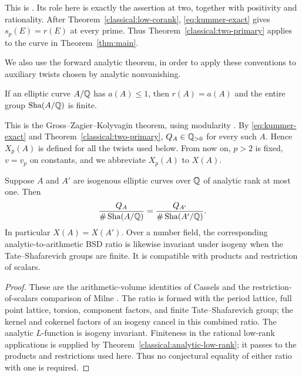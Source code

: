 This is \cite[Theorem~1.1]{B}. Its role here is exactly
the assertion at two, together with positivity and rationality.
After Theorem~\ref{classical:low-corank},
\eqref{eq:kummer-exact} gives $s_p(E)=r(E)$ at every prime. Thus
Theorem~\ref{classical:two-primary} applies to the curve in
Theorem~\ref{thm:main}.

We also use the forward analytic theorem, in order to apply these
conventions to auxiliary twists chosen by analytic nonvanishing.

\begin{theorem}\label{classical:analytic-low-rank}
If an elliptic curve $A/\mathbb Q$ has $a(A)\leq1$, then
$r(A)=a(A)$ and the entire group $\operatorname{Sha}(A/\mathbb Q)$ is finite.
\end{theorem}

This is the Gross--Zagier--Kolyvagin theorem, using modularity
\cite{GrossZagier,Kolyvagin,BCDT}. By \eqref{eq:kummer-exact} and
Theorem~\ref{classical:two-primary}, $Q_A\in\mathbb Q_{>0}$ for every such
$A$. Hence $X_p(A)$ is defined for all the twists used below.
From now on, $p>2$ is fixed, $v=v_p$ on constants, and we abbreviate
$X_p(A)$ to $X(A)$.

\begin{proposition}\label{classical:isogeny}
Suppose $A$ and $A'$ are isogenous elliptic curves over $\mathbb Q$ of
analytic rank at most one. Then
\[
 \frac{Q_A}{\#\operatorname{Sha}(A/\mathbb Q)}
       =\frac{Q_{A'}}{\#\operatorname{Sha}(A'/\mathbb Q)}.
\]
In particular $X(A)=X(A')$. Over a number field, the corresponding
analytic-to-arithmetic BSD ratio is likewise invariant under isogeny
when the Tate--Shafarevich groups are finite. It is compatible with
products and restriction of scalars.
\end{proposition}

\begin{proof}
These are the arithmetic-volume identities of Cassels and the
restriction-of-scalars comparison of Milne \cite{Cassels,MilneBSD}.
The ratio is formed with the period lattice, full point lattice,
torsion, component factors, and finite Tate--Shafarevich group;
the kernel and cokernel factors of an isogeny cancel in this combined
ratio. The analytic $L$-function is isogeny invariant. Finiteness in
the rational low-rank applications is supplied by
Theorem~\ref{classical:analytic-low-rank}; it passes to the products
and restrictions used here. Thus no conjectural equality of either
ratio with one is required.
\end{proof}

